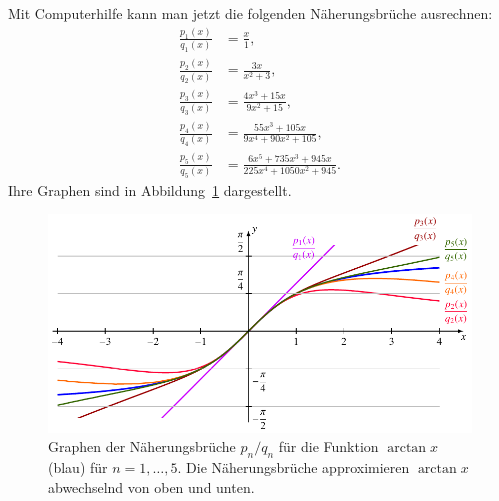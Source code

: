 \begin{refsection}
Mit Computerhilfe kann man jetzt die folgenden Näherungsbrüche ausrechnen:
\begin{align*}
\frac{p_1(x)}{q_1(x)} &= \frac{x}{1},
\\
\frac{p_2(x)}{q_2(x)} &= \frac{3x}{x^2+3},
\\
\frac{p_3(x)}{q_3(x)} &= \frac{4x^3+15x}{9x^2+15},
\\
\frac{p_4(x)}{q_4(x)} &= \frac{55x^3+105x}{9x^4+90x^2+105},
\\
\frac{p_5(x)}{q_5(x)} &= \frac{6x^5+735x^3+945x}{225x^4+1050x^2+945}.
\end{align*}
Ihre Graphen sind in Abbildung~\ref{arctan:figure:approx} dargestellt.
\begin{figure}
\centering
\includegraphics[width=\hsize]{papers/arctan/approx.pdf}
\caption{Graphen der Näherungsbrüche $p_n/q_n$ für die Funktion $\arctan x$
(blau)
für $n=1,\dots,5$.
Die Näherungsbrüche approximieren $\arctan x$ abwechselnd von oben und unten.
\label{arctan:figure:approx}}
\end{figure}


\end{refsection}
